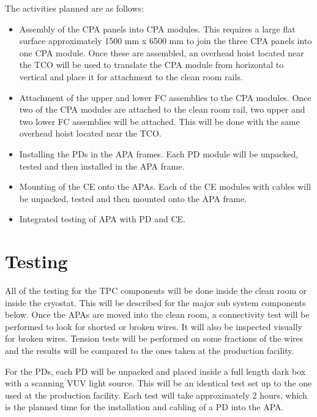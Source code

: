 The activities planned are as follows:
\begin{itemize}
\item Assembly of the CPA panels into CPA modules.  This requires a large flat surface approximately 1500 mm x 6500 mm to join the three CPA panels into one CPA module.  Once these are assembled, an overhead hoist located near the TCO will be used to translate the CPA module from horizontal to vertical and place it for attachment to the clean room rails.  
\item Attachment of the upper and lower FC assemblies to the CPA modules.  Once two of the CPA modules are attached to the clean room rail, two upper and two lower FC assemblies will be attached.  This will be done with the same overhead hoist located near the TCO.
\item Installing the PDs in the APA frames.  Each PD module will be unpacked, tested and then installed in the APA frame. 
\item Mounting of the CE onto the APAs.  Each of the CE modules with cables will be unpacked, tested and then mounted onto the APA frame.  
\item Integrated testing of APA with PD and CE.  
\end{itemize}

\section{Testing}

All of the testing for the TPC components will be done inside the clean room or inside the cryostat.  This will be described for the major sub system components below.
Once the APAs are moved into the clean room, a connectivity test will be performed to look for shorted or broken wires.  It will also be inspected visually for broken wires.  Tension tests will be performed on some fractions of the wires and the results will be compared to the ones taken at the production facility.

For the PDs, each PD will be unpacked and placed inside a full length dark box with a scanning VUV light source. This will be an identical test set up to the one used at the production facility.  Each test will take approximately 2 hours, which is the planned time for the installation and cabling of a PD into the APA.  

